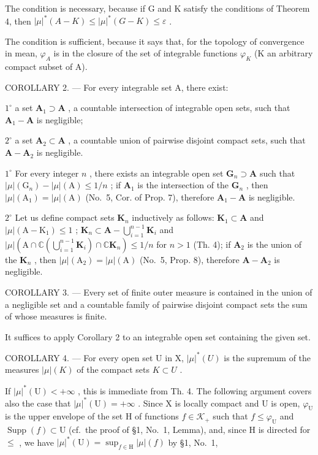 The condition is necessary, because if G and K satisfy the conditions of Theorem 4, then \(|\mu|^{*}(A - K) \leqslant |\mu|^{*}(G - K) \leqslant \varepsilon\) .

The condition is sufficient, because it says that, for the topology of convergence in mean, \(\varphi_{A}\) is in the closure of the set of integrable functions \(\varphi_{K}\) (K an arbitrary compact subset of A).

COROLLARY 2. --- For every integrable set A, there exist:

\(1^{\circ}\) a set \(\mathbf{A}_1\supset \mathbf{A}\) , a countable intersection of integrable open sets, such that \(\mathbf{A}_1 - \mathbf{A}\) is negligible;

\(2^{\circ}\) a set \(\mathbf{A}_2\subset \mathbf{A}\) , a countable union of pairwise disjoint compact sets, such that \(\mathbf{A} - \mathbf{A}_2\) is negligible.

\(1^{\circ}\) For every integer \(n\) , there exists an integrable open set \(\mathbf{G}_n \supset \mathbf{A}\) such that \(|\mu| (\mathrm{G}_n) - |\mu| (\mathrm{A}) \leqslant 1/n\) ; if \(\mathbf{A}_1\) is the intersection of the \(\mathbf{G}_n\) , then \(|\mu| (\mathrm{A}_1) = |\mu| (\mathrm{A})\) (No.~5, Cor. of Prop. 7), therefore \(\mathbf{A}_1 - \mathbf{A}\) is negligible.

\(2^{\circ}\) Let us define compact sets \(\mathbf{K}_n\) inductively as follows: \(\mathbf{K}_1 \subset \mathbf{A}\) and \(|\mu| (\mathrm{A} - \mathrm{K}_1) \leqslant 1\) ; \(\mathbf{K}_n \subset \mathbf{A} - \bigcup_{i=1}^{n-1} \mathbf{K}_i\) and \(|\mu| (\mathrm{A} \cap \mathbb{C}(\bigcup_{i=1}^{n-1} \mathbf{K}_i) \cap \mathbb{C} \mathbf{K}_n) \leqslant 1/n\) for \(n > 1\) (Th. 4); if \(\mathbf{A}_2\) is the union of the \(\mathbf{K}_n\) , then \(|\mu| (\mathrm{A}_2) = |\mu| (\mathrm{A})\) (No.~5, Prop. 8), therefore \(\mathbf{A} - \mathbf{A}_2\) is negligible.

COROLLARY 3. --- Every set of finite outer measure is contained in the union of a negligible set and a countable family of pairwise disjoint compact sets the sum of whose measures is finite.

It suffices to apply Corollary 2 to an integrable open set containing the given set.

COROLLARY 4. --- For every open set U in X, \(|\mu|^{*}(U)\) is the supremum of the measures \(|\mu|(K)\) of the compact sets \(K \subset U\) .

If \(|\mu|^*(\mathrm{U}) < +\infty\) , this is immediate from Th. 4. The following argument covers also the case that \(|\mu|^*(\mathrm{U}) = +\infty\) . Since X is locally compact and U is open, \(\varphi_{\mathrm{U}}\) is the upper envelope of the set H of functions \(f \in \mathcal{K}_{+}\) such that \(f \leqslant \varphi_{\mathrm{U}}\) and \(\operatorname{Supp}(f) \subset \mathrm{U}\) (cf.~the proof of §1, No.~1, Lemma), and, since H is directed for \(\leqslant\) , we have \(|\mu|^*(\mathrm{U}) = \sup_{f \in \mathrm{H}} |\mu|(f)\) by §1, No.~1,

